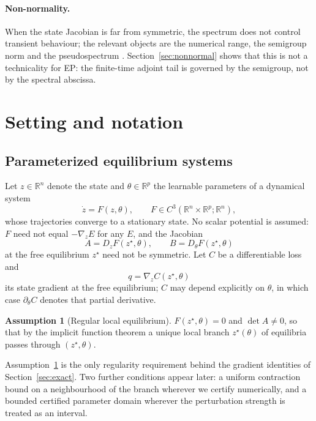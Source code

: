 \documentclass[11pt]{article}
\theoremstyle{definition}
\newtheorem{assumption}[theorem]{Assumption}
\theoremstyle{remark}
\newcommand{\R}{\mathbb{R}}
\newcommand{\grad}{\nabla}
\begin{document}
\paragraph{Non-normality.}
When the state Jacobian is far from symmetric, the spectrum does not control transient
behaviour; the relevant objects are the numerical range, the semigroup norm and the
pseudospectrum \cite{trefethen2005,higham2008}. Section~\ref{sec:nonnormal} shows that this is
not a technicality for EP: the finite-time adjoint tail is governed by the semigroup, not by the
spectral abscissa.

\section{Setting and notation}\label{sec:setting}

\subsection{Parameterized equilibrium systems}

Let $z \in \R^n$ denote the state and $\theta \in \R^p$ the learnable parameters of a
dynamical system
\begin{equation}
\dot z = F(z,\theta), \qquad F \in C^3(\R^n \times \R^p; \R^n),
\label{eq:dynamics}
\end{equation}
whose trajectories converge to a stationary state. No scalar potential is assumed: $F$ need not
equal $-\grad_z E$ for any $E$, and the Jacobian
\begin{equation}
A = D_z F(z^\star,\theta), \qquad B = D_\theta F(z^\star,\theta)
\label{eq:AB}
\end{equation}
at the free equilibrium $z^\star$ need not be symmetric. Let $C$ be a differentiable loss and
\begin{equation}
q = \grad_z C(z^\star,\theta)
\label{eq:q}
\end{equation}
its state gradient at the free equilibrium; $C$ may depend explicitly on $\theta$, in which case
$\partial_\theta C$ denotes that partial derivative.

\begin{assumption}[Regular local equilibrium]\label{ass:regular}
$F(z^\star,\theta) = 0$ and $\det A \neq 0$, so that by the implicit function theorem a unique
local branch $z^\star(\theta)$ of equilibria passes through $(z^\star,\theta)$.
\end{assumption}

Assumption~\ref{ass:regular} is the only regularity requirement behind the gradient identities
of Section~\ref{sec:exact}. Two further conditions appear later: a uniform contraction bound on a
neighbourhood of the branch wherever we certify numerically, and a bounded certified parameter
domain wherever the perturbation strength is treated as an interval.
\end{document}
